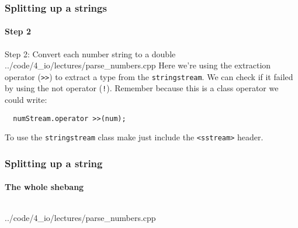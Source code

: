 \documentclass{beamer}
\begin{document}
\begin{frame}[fragile]
  \frametitle{Splitting up a strings}
  \framesubtitle{Step 2}
  
  \begin{block}{Step 2: Convert each number string to a double}
  		{../code/4_io/lectures/parse_numbers.cpp}
    Here we're using the extraction operator (\texttt{>>}) to extract a  type from the \texttt{stringstream}.\pause{} \newline
    We can check if it failed by using the not operator (\texttt{!}).  Remember because this is a class operator we could write:
    \begin{lstlisting}
  numStream.operator >>(num);
    \end{lstlisting}
	\end{block}
	To use the \texttt{stringstream} class make just include the \texttt{<sstream>} header.

\end{frame}

\begin{frame}[fragile]
  \frametitle{Splitting up a string}
  \framesubtitle{The whole shebang}
  \begin{columns}
    \begin{column}[T]{0.75\linewidth}
  			{../code/4_io/lectures/parse_numbers.cpp}
  	\end{column}
  	\begin{column}[T]{0.25\linewidth}
  	\end{column}
  \end{columns}  

\end{frame}
\end{document}
